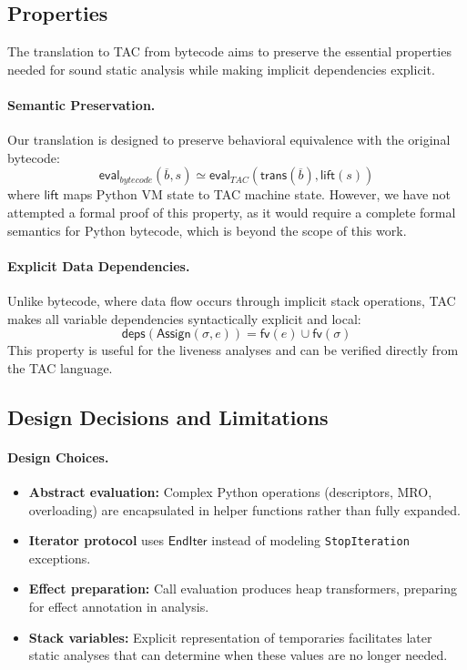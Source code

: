 \subsection{Properties}

The translation to TAC from bytecode aims to preserve the essential properties needed for sound static analysis while making implicit dependencies explicit.

\paragraph{Semantic Preservation.}
Our translation is designed to preserve behavioral equivalence with the original bytecode:
\[
\mathsf{eval}_{bytecode}(\overline{b}, s) \simeq \mathsf{eval}_{TAC}(\mathsf{trans}(\overline{b}), \mathsf{lift}(s))
\]
where $\mathsf{lift}$ maps Python VM state to TAC machine state. However, we have not attempted a formal proof of this property, as it would require a complete formal semantics for Python bytecode, which is beyond the scope of this work.

\paragraph{Explicit Data Dependencies.}
Unlike bytecode, where data flow occurs through implicit stack operations, TAC makes all variable dependencies syntactically explicit and local:
\[
\mathsf{deps}(\mathsf{Assign}(\sigma, e)) = \mathsf{fv}(e) \cup \mathsf{fv}(\sigma)
\]
This property is useful for the liveness analyses and can be verified directly from the TAC language.

\subsection{Design Decisions and Limitations}

\paragraph{Design Choices.}
\begin{itemize}
\item \textbf{Abstract evaluation:} Complex Python operations (descriptors, MRO, overloading) are encapsulated in helper functions rather than fully expanded.
\item \textbf{Iterator protocol} uses $\mathsf{EndIter}$ instead of modeling \texttt{StopIteration} exceptions.
\item \textbf{Effect preparation:} Call evaluation produces heap transformers, preparing for effect annotation in analysis.
\item \textbf{Stack variables:} Explicit representation of temporaries facilitates later static analyses that can determine when these values are no longer needed.
\end{itemize}

